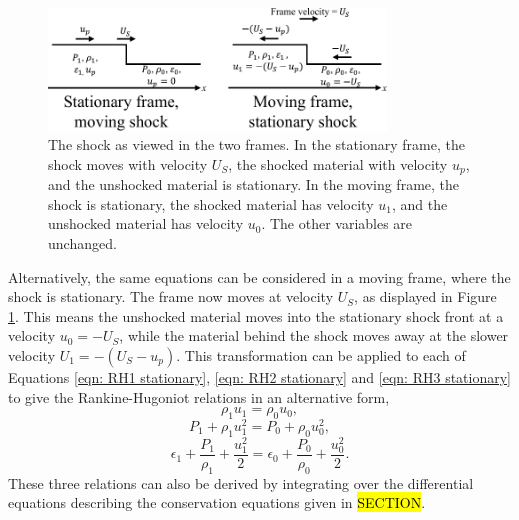 \begin{figure}
\centering
\includegraphics[width=0.8\textwidth]{figures/Theory/ReferenceFrames.pdf}%
\caption{\label{fig:ReferenceFrames} The shock as viewed in the two frames. In the stationary frame, the shock moves with velocity $U_S$, the shocked material with velocity $u_p$, and the unshocked material is stationary. In the moving frame, the shock is stationary, the shocked material has velocity $u_1$, and the unshocked material has velocity $u_0$. The other variables are unchanged.}
\end{figure}

Alternatively, the same equations can be considered in a moving frame, where the shock is stationary. The frame now moves at velocity $U_S$, as displayed in Figure \ref{fig:ReferenceFrames}. This means the unshocked material moves into the stationary shock front at a velocity $u_0 = -U_S$, while the material behind the shock moves away at the slower velocity $U_1 = -(U_S - u_p)$. This transformation can be applied to each of Equations \ref{eqn: RH1 stationary}, \ref{eqn: RH2 stationary} and \ref{eqn: RH3 stationary} to give the Rankine-Hugoniot relations in an alternative form,
\begin{equation} \rho_1 u_1 = \rho_0 u_0, \label{eqn: RH1 moving} \end{equation}
\begin{equation} P_1 + \rho_1 u_1^2 = P_0 + \rho_0 u_0^2, \label{eqn: RH2 moving} \end{equation}
\begin{equation} \epsilon_1 + \frac{P_1}{\rho_1} + \frac{u_1^2}{2} = \epsilon_0 + \frac{P_0}{\rho_0} + \frac{u_0^2}{2}. \label{eqn: RH3 moving} \end{equation}
These three relations can also be derived by integrating over the differential equations describing the conservation equations given in \hl{SECTION}.

